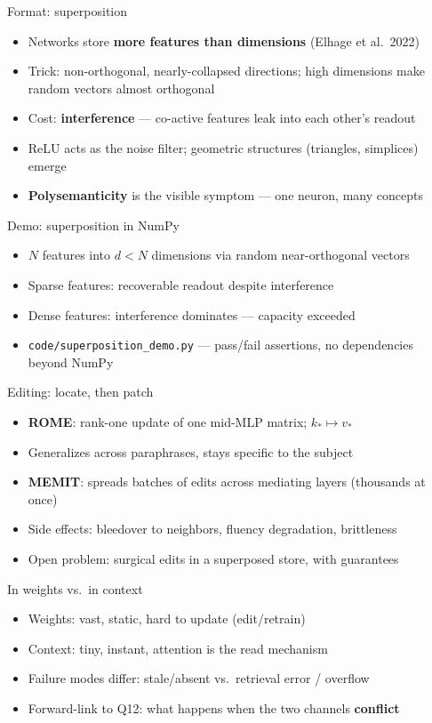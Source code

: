 \documentclass[aspectratio=169,11pt]{beamer}
\begin{document}
\begin{frame}{Format: superposition}
\begin{itemize}
\item Networks store \textbf{more features than dimensions} (Elhage et al.\ 2022)
\item Trick: non-orthogonal, nearly-collapsed directions; high dimensions make random vectors almost orthogonal
\item Cost: \textbf{interference} --- co-active features leak into each other's readout
\item ReLU acts as the noise filter; geometric structures (triangles, simplices) emerge
\item \textbf{Polysemanticity} is the visible symptom --- one neuron, many concepts
\end{itemize}
\end{frame}

\begin{frame}{Demo: superposition in NumPy}
\begin{itemize}
\item $N$ features into $d < N$ dimensions via random near-orthogonal vectors
\item Sparse features: recoverable readout despite interference
\item Dense features: interference dominates --- capacity exceeded
\item \texttt{code/superposition\_demo.py} --- pass/fail assertions, no dependencies beyond NumPy
\end{itemize}
\end{frame}

\begin{frame}{Editing: locate, then patch}
\begin{itemize}
\item \textbf{ROME}: rank-one update of one mid-MLP matrix; $k_* \mapsto v_*$
\item Generalizes across paraphrases, stays specific to the subject
\item \textbf{MEMIT}: spreads batches of edits across mediating layers (thousands at once)
\item Side effects: bleedover to neighbors, fluency degradation, brittleness
\item Open problem: surgical edits in a superposed store, with guarantees
\end{itemize}
\end{frame}

\begin{frame}{In weights vs.\ in context}
\begin{itemize}
\item Weights: vast, static, hard to update (edit/retrain)
\item Context: tiny, instant, attention is the read mechanism
\item Failure modes differ: stale/absent vs.\ retrieval error / overflow
\item Forward-link to Q12: what happens when the two channels \textbf{conflict}
\end{itemize}
\end{frame}
\end{document}
